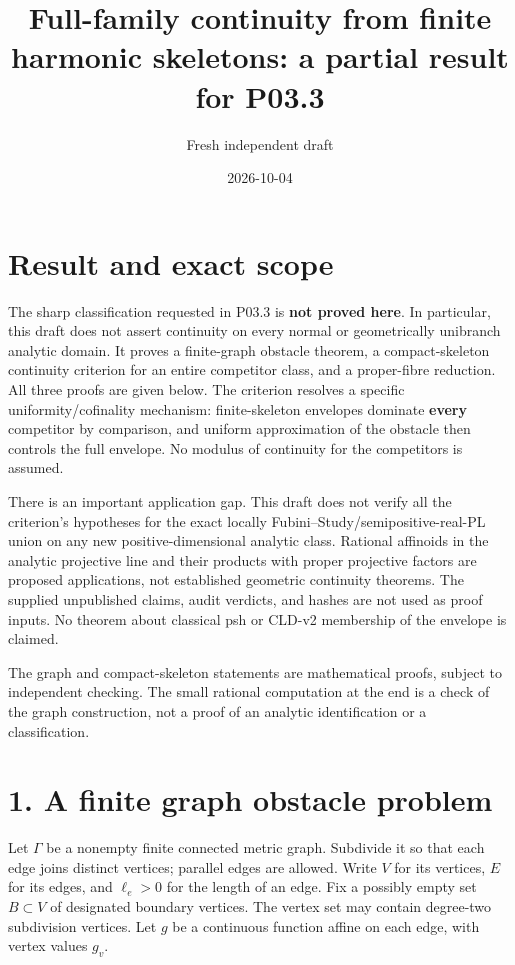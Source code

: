 \documentclass[
  11pt,
]{article}
\title{Full-family continuity from finite harmonic skeletons: a partial
result for P03.3}
\author{Fresh independent draft}
\date{2026-10-04}
\begin{document}
\maketitle

\section{Result and exact scope}\label{result-and-exact-scope}

The sharp classification requested in P03.3 is \textbf{not proved here}.
In particular, this draft does not assert continuity on every normal or
geometrically unibranch analytic domain. It proves a finite-graph
obstacle theorem, a compact-skeleton continuity criterion for an entire
competitor class, and a proper-fibre reduction. All three proofs are
given below. The criterion resolves a specific uniformity/cofinality
mechanism: finite-skeleton envelopes dominate \textbf{every} competitor
by comparison, and uniform approximation of the obstacle then controls
the full envelope. No modulus of continuity for the competitors is
assumed.

There is an important application gap. This draft does not verify all
the criterion's hypotheses for the exact locally
Fubini--Study/semipositive-real-PL union on any new positive-dimensional
analytic class. Rational affinoids in the analytic projective line and
their products with proper projective factors are proposed applications,
not established geometric continuity theorems. The supplied unpublished
claims, audit verdicts, and hashes are not used as proof inputs. No
theorem about classical psh or CLD-v2 membership of the envelope is
claimed.

The graph and compact-skeleton statements are mathematical proofs,
subject to independent checking. The small rational computation at the
end is a check of the graph construction, not a proof of an analytic
identification or a classification.

\section{1. A finite graph obstacle
problem}\label{a-finite-graph-obstacle-problem}

Let \(\Gamma\) be a nonempty finite connected metric graph. Subdivide it
so that each edge joins distinct vertices; parallel edges are allowed.
Write \(V\) for its vertices, \(E\) for its edges, and \(\ell_e>0\) for
the length of an edge. Fix a possibly empty set \(B\subset V\) of
designated boundary vertices. The vertex set may contain degree-two
subdivision vertices. Let \(g\) be a continuous function affine on each
edge, with vertex values \(g_v\).
\end{document}
